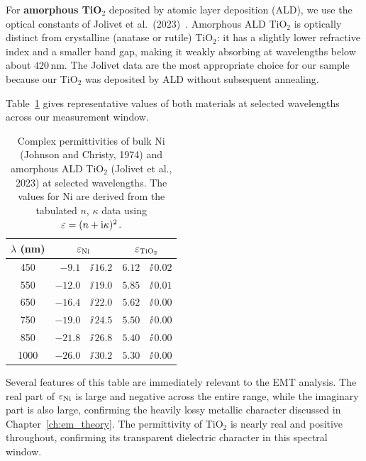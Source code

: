 For \textbf{amorphous TiO$_2$} deposited by atomic layer deposition (ALD), we
use the optical constants of Jolivet et al.\ (2023)~\cite{jolivet}. Amorphous
ALD TiO$_2$ is optically distinct from crystalline (anatase or rutile) TiO$_2$:
it has a slightly lower refractive index and a smaller band gap, making it
weakly absorbing at wavelengths below about $420$\,nm. The Jolivet data are
the most appropriate choice for our sample because our TiO$_2$ was deposited by
ALD without subsequent annealing.

Table~\ref{tab:ch3_material_constants} gives representative values of both
materials at selected wavelengths across our measurement window.

\begin{table}[h]
\centering
\caption{Complex permittivities of bulk Ni (Johnson and Christy, 1974) and
  amorphous ALD TiO$_2$ (Jolivet et al., 2023) at selected wavelengths.
  The values for Ni are derived from the tabulated $n$, $\kappa$ data using
  $\varepsilon = (n+\mathrm{i}\kappa)^2$.}
\label{tab:ch3_material_constants}
\begin{tabular}{c r@{$\,+\,$}l r@{$\,+\,$}l}
\toprule
$\lambda$ (nm)
  & \multicolumn{2}{c}{$\varepsilon_\text{Ni}$}
  & \multicolumn{2}{c}{$\varepsilon_\text{TiO$_2$}$} \\
\midrule
450  & $-9.1$   & $\ii\,16.2$ & $6.12$ & $\ii\,0.02$ \\
550  & $-12.0$  & $\ii\,19.0$ & $5.85$ & $\ii\,0.01$ \\
650  & $-16.4$  & $\ii\,22.0$ & $5.62$ & $\ii\,0.00$ \\
750  & $-19.0$  & $\ii\,24.5$ & $5.50$ & $\ii\,0.00$ \\
850  & $-21.8$  & $\ii\,26.8$ & $5.40$ & $\ii\,0.00$ \\
1000 & $-26.0$  & $\ii\,30.2$ & $5.30$ & $\ii\,0.00$ \\
\bottomrule
\end{tabular}
\end{table}

Several features of this table are immediately relevant to the EMT analysis.
The real part of $\varepsilon_\text{Ni}$ is large and negative across the entire
range, while the imaginary part is also large, confirming the heavily lossy
metallic character discussed in Chapter~\ref{ch:em_theory}. The permittivity
of TiO$_2$ is nearly real and positive throughout, confirming its transparent
dielectric character in this spectral window.

